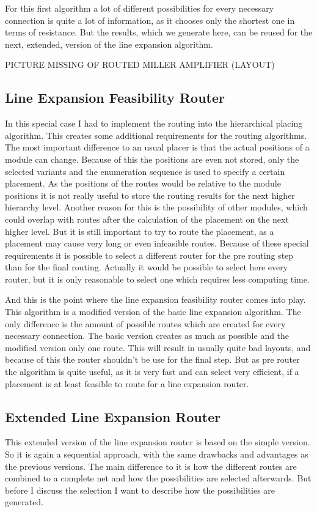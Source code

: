 For this first algorithm a lot of different possibilities for every necessary connection is quite a lot of information, as it chooses only the shortest one in terms of resistance. But the results, which we generate here, can be reused for the next, extended, version of the line expansion algorithm.

PICTURE MISSING OF ROUTED MILLER AMPLIFIER (LAYOUT)

\subsection{Line Expansion Feasibility Router}
In this special case I had to implement the routing into the hierarchical placing algorithm. This creates some additional requirements for the routing algorithms. The most important difference to an usual placer is that the actual positions of a module can change. Because of this the positions are even not stored, only the selected variants and the enumeration sequence is used to specify a certain placement. As the positions of the routes would be relative to the module positions it is not really useful to store the routing results for the next higher hierarchy level. Another reason for this is the possibility of other modules, which could overlap with routes after the calculation of the placement on the next higher level. But it is still important to try to route the placement, as a placement may cause very long or even infeasible routes. Because of these special requirements it is possible to select a different router for the pre routing step than for the final routing. Actually it would be possible to select here every router, but it is only reasonable to select one which requires less computing time.

And this is the point where the line expansion feasibility router comes into play. This algorithm is a modified version of the basic line expansion algorithm. The only difference  is the amount of possible routes which are created for every necessary connection. The basic version creates as much as possible and the modified version only one route. This will result in usually quite bad layouts, and because of this the router shouldn't be use for the final step. But as pre router the algorithm is quite useful, as it is very fast and can select very efficient, if a placement is at least feasible to route for a line expansion router.

\subsection{Extended Line Expansion Router}
This extended version of the line expansion router is based on the simple version. So it is again a sequential approach, with the same drawbacks and advantages as the previous versions. The main difference to it is how the different routes are combined to a complete net and how the possibilities are selected afterwards. But before I discuss the selection I want to describe how the possibilities are generated.


